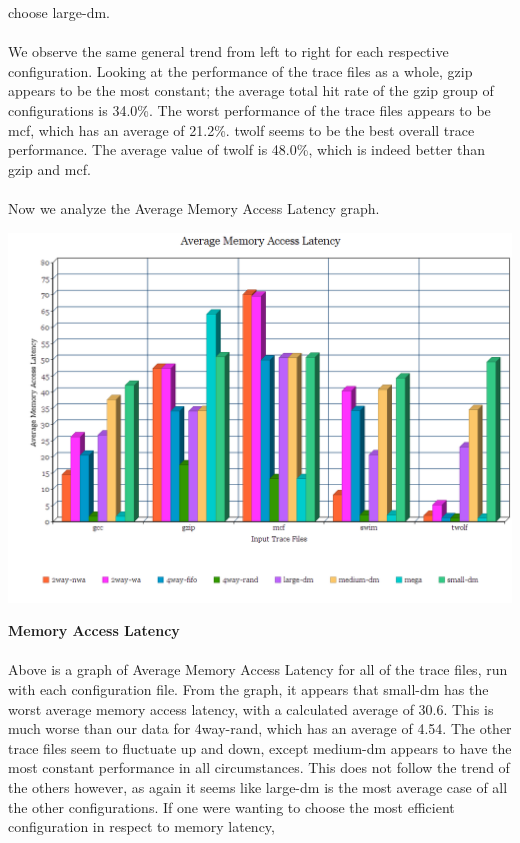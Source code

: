 \documentclass[12pt]{article}
\begin{document}
choose large-dm.
\\\\
We observe the same general trend from left to right for each
respective configuration. Looking at the performance of the
trace files as a whole, gzip appears to be the most constant;
the average total hit rate
of the gzip group of configurations is 34.0\%. The worst performance
of the trace files appears to be mcf,
which has an average of 21.2\%.
twolf seems to be the best overall trace performance. The average
value of twolf is 48.0\%, which is indeed better than gzip and mcf.
\\\\
Now we analyze the Average Memory Access Latency graph.\\
\begin{center}
\includegraphics[scale=0.5]{latency}
\end{center}
{\bf Memory Access Latency}\\\\
Above is a graph of Average Memory Access Latency for all of the
trace files, run with each configuration file.
From the graph, it appears that small-dm has the worst average
memory access latency, with a calculated average of 30.6. This
is much worse than our data for 4way-rand, which has an average
of 4.54. The other trace files seem to fluctuate up and down,
except medium-dm appears to have the most constant performance
in all circumstances. This does not follow the trend of the others
however, as again it seems like large-dm is the most average
case of all the other configurations. If one were wanting to choose
the most efficient configuration in respect to memory latency,
\end{document}
